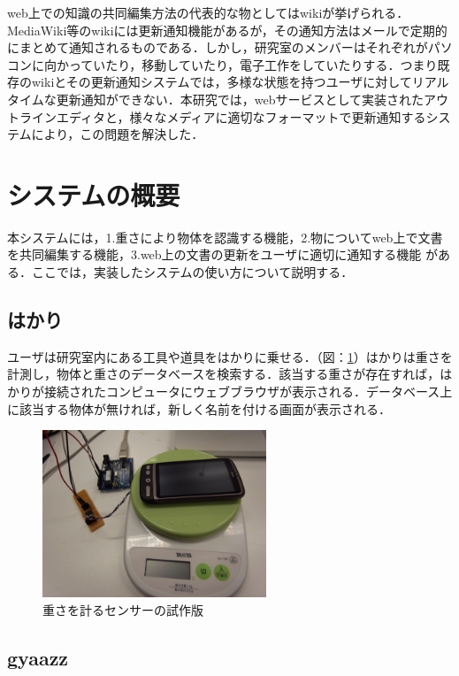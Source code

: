 web上での知識の共同編集方法の代表的な物としてはwikiが挙げられる．MediaWiki\cite{mediawiki}等のwikiには更新通知機能があるが，その通知方法はメールで定期的にまとめて通知されるものである．しかし，研究室のメンバーはそれぞれがパソコンに向かっていたり，移動していたり，電子工作をしていたりする．つまり既存のwikiとその更新通知システムでは，多様な状態を持つユーザに対してリアルタイムな更新通知ができない．本研究では，webサービスとして実装されたアウトラインエディタと，様々なメディアに適切なフォーマットで更新通知するシステムにより，この問題を解決した．


\section{システムの概要}
本システムには，1.重さにより物体を認識する機能，2.物についてweb上で文書を共同編集する機能，3.web上の文書の更新をユーザに適切に通知する機能 がある．ここでは，実装したシステムの使い方について説明する．

\subsection{はかり}

ユーザは研究室内にある工具や道具をはかりに乗せる．（図：\ref{fig:sensor}）はかりは重さを計測し，物体と重さのデータベースを検索する．該当する重さが存在すれば，はかりが接続されたコンピュータにウェブブラウザが表示される．データベース上に該当する物体が無ければ，新しく名前を付ける画面が表示される．

\begin{figure}
  \begin{center}
    \includegraphics[height=50mm]{img/sensor.png}
  \end{center}
  \caption{重さを計るセンサーの試作版}
  \label{fig:sensor}
\end{figure}

\subsection{gyaazz}

